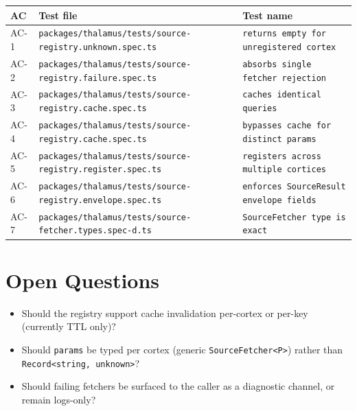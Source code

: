 \begin{center}
\begin{tabular}{@{}lll@{}}
\toprule
AC & Test file & Test name \\
\midrule
AC-1 & \texttt{packages/thalamus/tests/source-registry.unknown.spec.ts} & \texttt{returns empty for unregistered cortex} \\
AC-2 & \texttt{packages/thalamus/tests/source-registry.failure.spec.ts} & \texttt{absorbs single fetcher rejection} \\
AC-3 & \texttt{packages/thalamus/tests/source-registry.cache.spec.ts} & \texttt{caches identical queries} \\
AC-4 & \texttt{packages/thalamus/tests/source-registry.cache.spec.ts} & \texttt{bypasses cache for distinct params} \\
AC-5 & \texttt{packages/thalamus/tests/source-registry.register.spec.ts} & \texttt{registers across multiple cortices} \\
AC-6 & \texttt{packages/thalamus/tests/source-registry.envelope.spec.ts} & \texttt{enforces SourceResult envelope fields} \\
AC-7 & \texttt{packages/thalamus/tests/source-fetcher.types.spec-d.ts} & \texttt{SourceFetcher type is exact} \\
\bottomrule
\end{tabular}
\end{center}

\section{Open Questions}
\begin{itemize}[leftmargin=1.2em]
  \item Should the registry support cache invalidation per-cortex or per-key (currently TTL only)?
  \item Should \texttt{params} be typed per cortex (generic \texttt{SourceFetcher<P>}) rather than \texttt{Record<string, unknown>}?
  \item Should failing fetchers be surfaced to the caller as a diagnostic channel, or remain logs-only?
\end{itemize}


